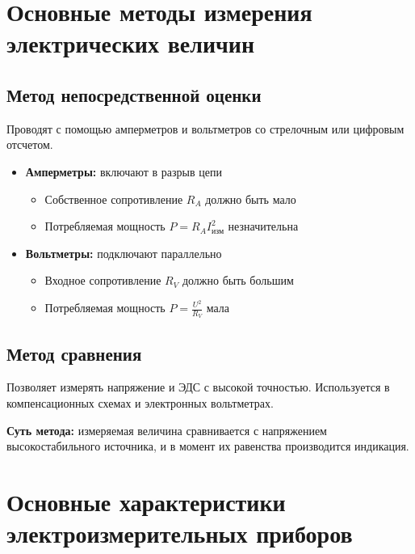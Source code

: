 \documentclass[14pt, a4paper, twoside]{extreport}
\begin{document}
\section{Основные методы измерения электрических величин}

\subsection{Метод непосредственной оценки}
Проводят с помощью амперметров и вольтметров со стрелочным или цифровым отсчетом.

\begin{itemize}
  \item \textbf{Амперметры:} включают в разрыв цепи
    \begin{itemize}
      \item Собственное сопротивление $R_A$ должно быть мало
      \item Потребляемая мощность $P = R_A I^2_{\text{изм}}$ незначительна
    \end{itemize}

  \item \textbf{Вольтметры:} подключают параллельно
    \begin{itemize}
      \item Входное сопротивление $R_V$ должно быть большим
      \item Потребляемая мощность $P = \frac{U^2}{R_V}$ мала
    \end{itemize}
\end{itemize}

\subsection{Метод сравнения}
Позволяет измерять напряжение и ЭДС с высокой точностью. Используется в компенсационных схемах и электронных вольтметрах.

\textbf{Суть метода:} измеряемая величина сравнивается с напряжением высокостабильного источника, и в момент их равенства производится индикация.

\section{Основные характеристики электроизмерительных приборов}
\end{document}
